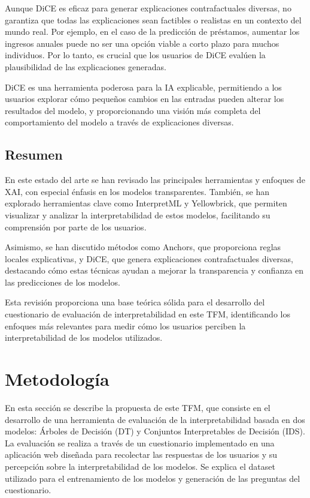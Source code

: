 Aunque DiCE es eficaz para generar explicaciones contrafactuales diversas, no garantiza que todas las explicaciones sean factibles o realistas en un contexto del mundo real. Por ejemplo, en el caso de la predicción de préstamos, aumentar los ingresos anuales puede no ser una opción viable a corto plazo para muchos individuos. Por lo tanto, es crucial que los usuarios de DiCE evalúen la plausibilidad de las explicaciones generadas.

DiCE es una herramienta poderosa para la IA explicable, permitiendo a los usuarios explorar cómo pequeños cambios en las entradas pueden alterar los resultados del modelo, y proporcionando una visión más completa del comportamiento del modelo a través de explicaciones diversas.



\section{Resumen}

En este estado del arte se han revisado las principales herramientas y enfoques de XAI, con especial énfasis en los modelos transparentes. También, se han explorado herramientas clave como InterpretML y Yellowbrick, que permiten visualizar y analizar la interpretabilidad de estos modelos, facilitando su comprensión por parte de los usuarios.

Asimismo, se han discutido métodos como Anchors, que proporciona reglas locales explicativas, y DiCE, que genera explicaciones contrafactuales diversas, destacando cómo estas técnicas ayudan a mejorar la transparencia y confianza en las predicciones de los modelos.

Esta revisión proporciona una base teórica sólida para el desarrollo del cuestionario de evaluación de interpretabilidad en este TFM, identificando los enfoques más relevantes para medir cómo los usuarios perciben la interpretabilidad de los modelos utilizados.

\chapter{Metodología}

En esta sección se describe la propuesta de este TFM, que consiste en el desarrollo de una herramienta de evaluación de la interpretabilidad basada en dos modelos: Árboles de Decisión (DT) y Conjuntos Interpretables de Decisión (IDS). La evaluación se realiza a través de un cuestionario implementado en una aplicación web diseñada para recolectar las respuestas de los usuarios y su percepción sobre la interpretabilidad de los modelos. Se explica el dataset utilizado para el entrenamiento de los modelos y generación de las preguntas del cuestionario. 

